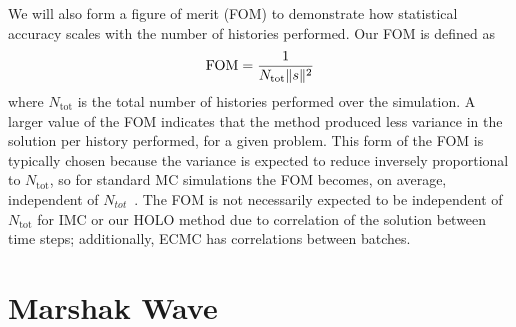 We will also form a figure of merit (FOM) to demonstrate how statistical accuracy
scales with the number of histories performed.  Our FOM is defined as
\begin{equation}\label{eq:fom}
    \text{FOM} = \frac{1}{N_{\text{tot}}\|s\|^2}
\end{equation}
where $N_{\text{tot}}$ is the total number of histories performed over the simulation.
A larger value of the FOM indicates that the method produced less variance in the
solution per history performed, for a given problem.  This form of the FOM
is typically chosen because the variance is expected to reduce inversely proportional
to $N_{\text{tot}}$, so for standard MC simulations the FOM becomes, on average, independent of
$N_{tot}$~\cite{shultis_mc}.  The FOM is not necessarily expected to be independent
of $N_{\text{tot}}$ for IMC or
our HOLO method due to correlation of the solution between time steps; additionally, ECMC
has correlations between batches.





\section{Marshak Wave}
\label{sec:marsh}

